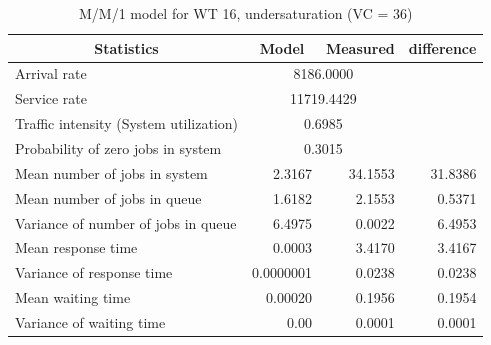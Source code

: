 \documentclass[11pt,a4paper]{article}
\begin{document}
\begin{table}[H]
	\centering
	\caption{M/M/1 model for WT 16, undersaturation (VC = 36)}
	\begin{tabular}{|l|r|r|r|}
		\hline
		\multicolumn{1}{|c|}{Statistics} & \multicolumn{1}{c|}{Model} & \multicolumn{1}{c|}{Measured} & \multicolumn{1}{c|}{difference} \\ \hline
		Arrival rate & \multicolumn{ 2}{c|}{8186.0000} & \multicolumn{1}{l|}{} \\ \hline
		Service rate & \multicolumn{ 2}{c|}{11719.4429} & \multicolumn{1}{l|}{} \\ \hline
		Traffic intensity (System utilization) & \multicolumn{ 2}{c|}{0.6985} & \multicolumn{1}{l|}{} \\ \hline
		Probability of zero jobs in system & \multicolumn{ 2}{c|}{0.3015} & \multicolumn{1}{l|}{} \\ \hline
		Mean number of jobs in system & 2.3167 & 34.1553 & 31.8386 \\ \hline
		Mean number of jobs in queue & 1.6182 & 2.1553 & 0.5371 \\ \hline
		Variance of number of jobs in queue & 6.4975 & 0.0022 & 6.4953 \\ \hline
		Mean response time & 0.0003 & 3.4170 & 3.4167 \\ \hline
		Variance of response time & 0.0000001 & 0.0238 & 0.0238 \\ \hline
		Mean waiting time & 0.00020 & 0.1956 & 0.1954 \\ \hline
		Variance of waiting time & 0.00 & 0.0001 & 0.0001 \\ \hline
	\end{tabular}
	\label{}
\end{table}
\end{document}
